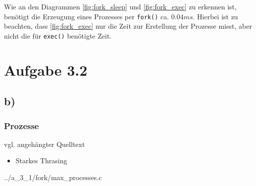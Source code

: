\documentclass[a4paper,
12pt,
BCOR12mm,
]{scrartcl}
\begin{document}
Wie an den Diagrammen \ref{fig:fork_sleep} und \ref{fig:fork_exec} zu erkennen ist,
benötigt die Erzeugung eines Prozesses per \verb|fork()| ca. $0.04ms$.
Hierbei ist zu beachten, dass \ref{fig:fork_exec} nur die Zeit zur Erstellung der Prozesse
misst, aber nicht die für \verb|exec()| benötigte Zeit. \\


\section{Aufgabe 3.2}
\subsection{b)}
\subsubsection{Prozesse}
vgl. angehängter Quelltext
	\begin{itemize}
		\item Starkes Thrasing
	\end{itemize}
\begin{figure}[h!]
	\begin{center}
	\end{center}
\end{figure}

	
	{../a_3_1/fork/max_processes.c}
\end{document}
